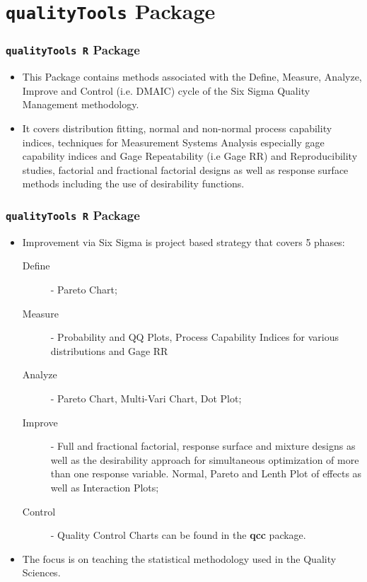 \documentclass{beamer}
\begin{document}
\section{\texttt{qualityTools} Package}
\begin{frame}
\frametitle{\texttt{qualityTools R} Package}
\begin{itemize}
\item This Package contains methods associated with the Define, Measure, Analyze, Improve and Control (i.e. DMAIC) cycle of the Six Sigma Quality Management methodology.
\item It covers distribution fitting, normal and non-normal process capability indices, techniques for Measurement Systems Analysis especially gage capability indices and Gage Repeatability (i.e Gage RR) and Reproducibility studies, factorial and fractional factorial designs as well as response surface methods including the use of desirability functions. 
\end{itemize}
\end{frame}

\begin{frame}
\frametitle{\texttt{qualityTools R} Package}
\begin{itemize}
\item Improvement via Six Sigma is project based strategy that covers 5 phases: 
\begin{description}
\item[Define] - Pareto Chart; 
\item[Measure] - Probability and QQ Plots, Process Capability Indices for various distributions and Gage RR 
\item[Analyze] - Pareto Chart, Multi-Vari Chart, Dot Plot; 
\item[Improve] - Full and fractional factorial, response surface and mixture designs as well as the desirability approach for simultaneous optimization of more than one response variable. Normal, Pareto and Lenth Plot of effects as well as Interaction Plots; 
\item[Control] - Quality Control Charts can be found in the \textbf{qcc} package. 
\end{description}

\item The focus is on teaching the statistical methodology used in the Quality Sciences.
\end{itemize}
\end{frame}
\end{document}
